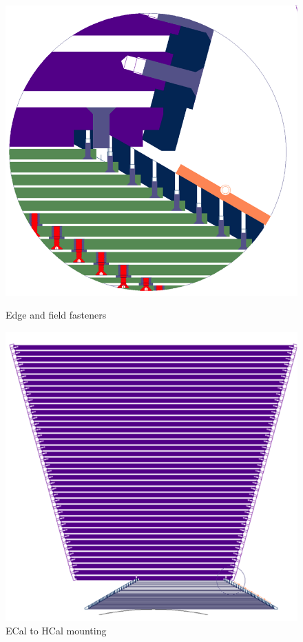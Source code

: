 \begin{figure}
	\begin{minipage}[b]{.49\textwidth}
		\includegraphics[width=\linewidth]{Calorimeter/SiliconTungstenSiD/edgeFasteners}
		\caption{Edge and field fasteners}
		\label{fig:Calorimeter:SiDECAL:edgeFasteners}
	\end{minipage}\hfill
	\begin{minipage}[b]{.49\textwidth}
		\includegraphics[width=\linewidth]{Calorimeter/SiliconTungstenSiD/ecalMounting}
		\caption{ECal to HCal mounting}
		\label{fig:Calorimeter:SiDECAL:ecalMounting}
	\end{minipage}
\end{figure}
